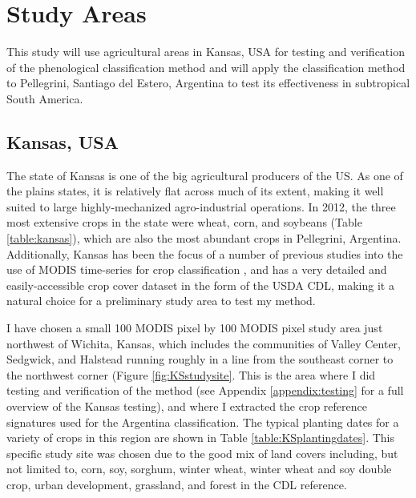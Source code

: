 \chapter{Study Areas}

This study will use agricultural areas in Kansas, USA for testing and verification of the phenological classification method and will apply the classification method to Pellegrini, Santiago del Estero, Argentina to test its effectiveness in subtropical South America.

\section{Kansas, USA}

The state of Kansas is one of the big agricultural producers of the US. As one of the plains states, it is relatively flat across much of its extent, making it well suited to large highly-mechanized agro-industrial operations. In 2012, the three most extensive crops in the state were wheat, corn, and soybeans (Table \ref{table:kansas}), which are also the most abundant crops in Pellegrini, Argentina. Additionally, Kansas has been the focus of a number of previous studies into the use of MODIS time-series for crop classification \autocites{wardlow2002discriminating}{wardlow2005state-level}{wardlow2007analysis}{wardlow2008large-area}, and has a very detailed and easily-accessible crop cover dataset in the form of the USDA CDL, making it a natural choice for a preliminary study area to test my method.

I have chosen a small 100 MODIS pixel by 100 MODIS pixel study area just northwest of Wichita, Kansas, which includes the communities of Valley Center, Sedgwick, and Halstead running roughly in a line from the southeast corner to the northwest corner (Figure \ref{fig:KSstudysite}. This is the area where I did testing and verification of the method (see Appendix \ref{appendix:testing} for a full overview of the Kansas testing), and where I extracted the crop reference signatures used for the Argentina classification. The typical planting dates for a variety of crops in this region are shown in Table \ref{table:KSplantingdates}. This specific study site was chosen due to the good mix of land covers including, but not limited to, corn, soy, sorghum, winter wheat, winter wheat and soy double crop, urban development, grassland, and forest in the CDL reference.


